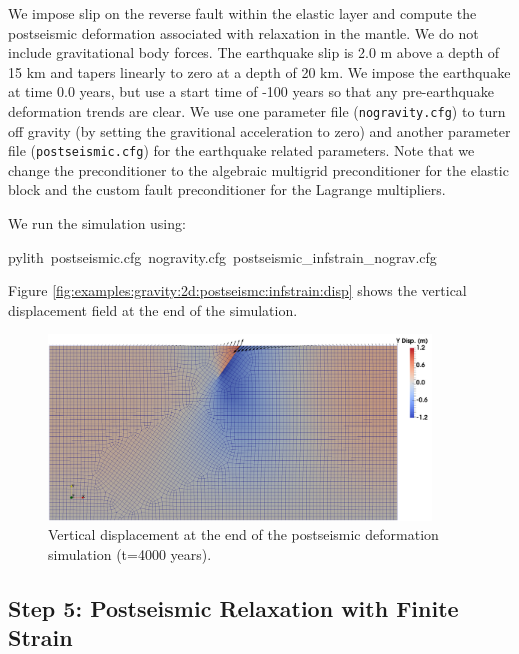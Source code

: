 We impose slip on the reverse fault within the elastic layer and compute
the postseismic deformation associated with relaxation in the mantle.
We do not include gravitational body forces. The earthquake slip is
2.0 m above a depth of 15 km and tapers linearly to zero at a depth
of 20 km. We impose the earthquake at time 0.0 years, but use a start
time of -100 years so that any pre-earthquake deformation trends are
clear. We use one parameter file (\texttt{nogravity.cfg}) to turn
off gravity (by setting the gravitional acceleration to zero) and
another parameter file (\texttt{postseismic.cfg}) for the earthquake
related parameters. Note that we change the preconditioner to the
algebraic multigrid preconditioner for the elastic block and the custom
fault preconditioner for the Lagrange multipliers. 

We run the simulation using:
\begin{lyxcode}
pylith~postseismic.cfg~nogravity.cfg~postseismic\_infstrain\_nograv.cfg
\end{lyxcode}
Figure \vref{fig:examples:gravity:2d:postseismc:infstrain:disp} shows
the vertical displacement field at the end of the simulation.

\begin{figure}
\begin{centering}
\includegraphics[width=4in]{tutorials/grav2d/figs/postseismic_infstrain_nograv-disp}
\par\end{centering}

\caption{Vertical displacement at the end of the postseismic deformation simulation
(t=4000 years).\label{fig:examples:gravity:2d:postseismc:infstrain:disp}}
\end{figure}



\subsection{Step 5: Postseismic Relaxation with Finite Strain}

